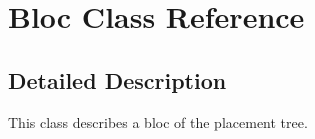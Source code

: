 \hypertarget{class_bloc}{}\section{Bloc Class Reference}
\label{class_bloc}


\subsection{Detailed Description}
This class describes a bloc of the placement tree. 